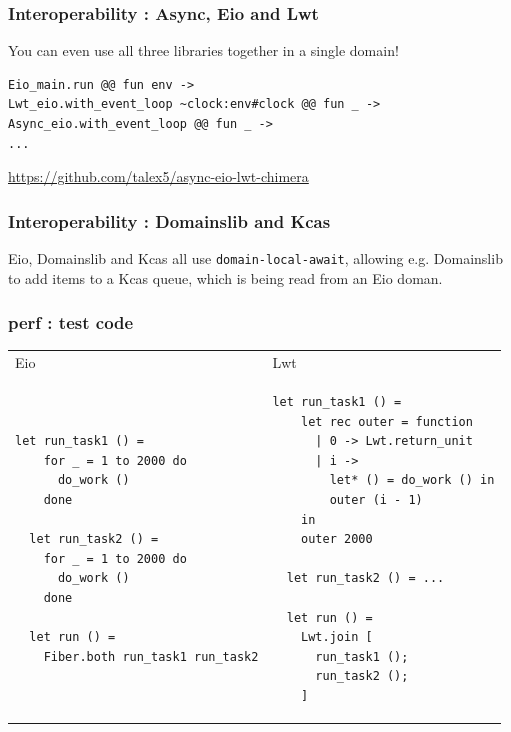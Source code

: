 \documentclass{beamer}
\begin{document}
\begin{frame}[fragile]
	\frametitle{Interoperability : Async, Eio and Lwt}
	You can even use all three libraries together in a single domain!
	\bigskip
\begin{lstlisting}[style=ocaml]
Eio_main.run @@ fun env ->
Lwt_eio.with_event_loop ~clock:env#clock @@ fun _ ->
Async_eio.with_event_loop @@ fun _ ->
...
\end{lstlisting}
	\bigskip
	\url{https://github.com/talex5/async-eio-lwt-chimera}
\end{frame}

\begin{frame}[fragile]
	\frametitle{Interoperability : Domainslib and Kcas}
	Eio, Domainslib and Kcas all use \verb|domain-local-await|,
	allowing e.g. Domainslib to add items to a Kcas queue,
	which is being read from an Eio doman.
\end{frame}



\begin{frame}[fragile]
	\frametitle{perf : test code}
\begin{tabular}{ll}
        Eio & Lwt \\
\begin{lstlisting}[style=ocaml,boxpos=t]
  let run_task1 () =
    for _ = 1 to 2000 do
      do_work ()
    done

  let run_task2 () =
    for _ = 1 to 2000 do
      do_work ()
    done

  let run () =
    Fiber.both run_task1 run_task2
\end{lstlisting}&
\begin{lstlisting}[style=ocaml,boxpos=t]
  let run_task1 () =
    let rec outer = function
      | 0 -> Lwt.return_unit
      | i ->
        let* () = do_work () in
        outer (i - 1)
    in
    outer 2000

  let run_task2 () = ...

  let run () =
    Lwt.join [
      run_task1 ();
      run_task2 ();
    ]
\end{lstlisting}
\end{tabular}
\end{frame}
\end{document}
